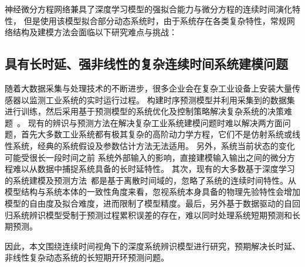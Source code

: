 神经微分方程网络兼具了深度学习模型的强拟合能力与微分方程的连续时间演化特性，
但是使用该模型拟合部分动态系统时，由于系统存在各类复杂特性，常规网络结构及建模方法会面临以下研究难点与挑战：
\subsection{具有长时延、强非线性的复杂连续时间系统建模问题}
随着大数据采集与处理技术的不断进步，很多企业会在复杂工业设备上安装大量传感器以监测工业系统的实时运行过程。
构建时序预测模型并利用采集到的数据集进行训练，然后采用基于预测模型的系统优化及控制策略解决复杂系统的决策难题~\cite{Yuan2020,Member2019,wu2020optimization}。
现有的辨识与预测方法在解决复杂工业系统建模问题时难以解决两方面问题，首先大多数工业系统都有极其复杂的高阶动力学方程，它们不是仿射系统或线性系统，经典的系统假设及参数估计方法无法适用。
另外，系统当前状态的变化可能受很长一段时间之前
系统外部输入的影响，直接建模输入输出之间的微分方程难以从数据中捕捉系统具备的长时延特性。
其次，现有的大多数基于深度学习的系统建模及预测方法~\cite{Member2019,Essien2020,9161367,9522017,neu2021systematic}都是基于离散时间域的，忽略了系统的连续时间特性。从模型结构与系统本体的一致性角度来看，忽视系统本身具备的物理先验特性会增加模型的自由度及拟合难度，进而限制了模型精度。最后，另外基于数据驱动的自回归系统辨识模型受制于预测过程累积误差的存在，难以同时处理系统短期预测和长期预测。

因此，本文围绕连续时间视角下的深度系统辨识模型进行研究，预期解决长时延、非线性复杂动态系统的长短期开环预测问题。


